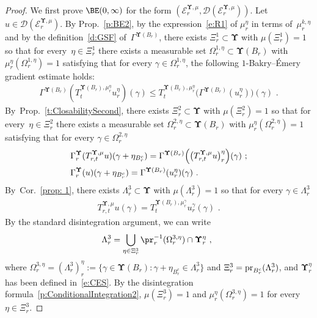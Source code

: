 \documentclass[11pt,letterpaper]{amsart}
\newcommand{\comma}{\,\,\mathrm{,}\;\,}
\newcommand{\fstop}{\,\,\mathrm{.}}
\newcommand{\cdc}{\Gamma}
\newcommand{\QP}{{\mu}}
\newcommand{\dUpsilon}{{\mathbf \Upsilon}}
\newcommand{\U}{\dUpsilon}
\newcommand{\E}{\mathcal E}
\renewcommand{\1}{\mathbf 1}
\numberwithin{equation}{section}
\theoremstyle{plain}
\theoremstyle{definition}
\theoremstyle{remark}
\begin{document}
\begin{proof}
We first prove $\BE(0,\infty)$ for the form $(\E^{\U, \QP}_{r}, \mathcal D(\E^{\U, \QP}_r))$.
Let $u \in \mathcal D(\E^{\U, \QP}_r)$. By Prop.~\ref{p:BE2},  by the expression~\eqref{e:R1} of $\QP_r^\eta$ in terms of~$\QP_r^{k, \eta}$ and by the definition~\eqref{d:GSF} of~$\cdc^{\U(B_r)}$, there exists $\Xi_r^1 \subset \U$ with $\QP(\Xi_r^1)=1$ so that for every~$\eta \in \Xi_r^1$ there exists a measurable set $\Omega_{r}^{1, \eta} \subset \U(B_r)$ with  $\QP_{r}^{\eta}(\Omega_{r}^{1, \eta} )=1$ satisfying that for every $\gamma \in \Omega_{r}^{1, \eta}$, the following $1$-Bakry--\'Emery gradient estimate holds:
\begin{align} \label{e:BE2}
\Gamma^{\U(B_r)}(T_t^{\U(B_r), \QP_r^\eta}u_{r}^\eta)(\gamma) \le T_t^{\U(B_r), \QP_r^\eta}\bigl(\Gamma^{\U(B_r)}(u_{r}^\eta)\bigr)(\gamma) \fstop
\end{align}
By~Prop.~\ref{t:ClosabilitySecond}, there exists $\Xi_r^2 \subset \U$ with $\QP(\Xi_r^2)=1$ so that for every~$\eta \in \Xi_r^2$ there exists a measurable set $\Omega_{r}^{2, \eta} \subset \U(B_r)$ with  $\QP_{r}^{\eta}(\Omega_{r}^{2, \eta} )=1$ satisfying that for every $\gamma \in \Omega_{r}^{2, \eta}$ 
\begin{align} \label{e:BE3}
&\cdc^{\U}_r(T_{r, t}^{\U, \QP} u)(\gamma+\eta_{B_r^c})=\Gamma^{\U(B_r)}\Bigl( \bigl(T_{r, t}^{\U, \QP} u\bigr)_r^\eta\Bigr)(\gamma)  \ ;
\\
&\cdc^{\U}_r(u)(\gamma+\eta_{B_r^c})=\Gamma^{\U(B_r)}( u_r^\eta)(\gamma) \fstop \notag
\end{align}
By~Cor.~\ref{prop: 1}, there exists $\Lambda^3_r \subset \U$ with $\QP(\Lambda^3_r)=1$ so that for every $\gamma \in \Lambda^3_r$
\begin{align} \label{e:BE4}
T_{r, t}^{\U, \QP} u(\gamma)=T_{t}^{\U(B_r), \QP_r^\gamma} u_r^\gamma(\gamma)  \fstop
\end{align}
By the standard disintegration argument, we can write 
$$\Lambda^3_r=\bigcup_{\eta \in \Xi_r^3}\pr_{r}^{-1}(\Omega_{r}^{3, \eta})\cap \U_{r}^{\eta} \comma$$ where $ \Omega_{r}^{3, \eta}=(\Lambda^3_r)_r^\eta:=\{\gamma \in \U(B_r): \gamma+\eta_{B_r^c} \in \Lambda^3_r\}$ and $\Xi_r^3={\rm pr}_{B_r^c}(\Lambda^3_r)$, and $ \U_{r}^{\eta}$ has been defined in~\eqref{e:CES}. 
By the disintegration formula~\eqref{p:ConditionalIntegration2}, $\QP(\Xi_r^3)=1$ and $\QP_r^\eta(\Omega_{r}^{3, \eta})=1$ for every~$\eta \in \Xi_r^3$. 


\end{proof}
\end{document}

